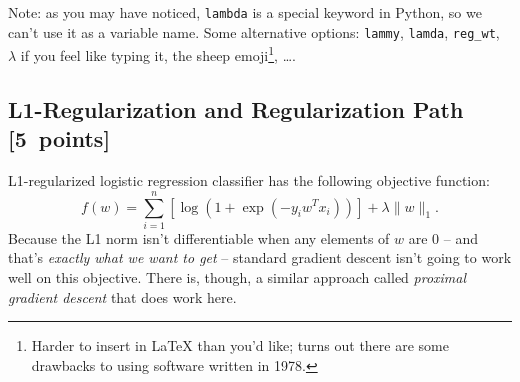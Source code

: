 \documentclass{article}
\newcommand\pts[1]{\textcolor{pointscolour}{[#1~points]}}
\newcommand{\norm}[1]{\lVert #1 \rVert}
\begin{document}
Note: as you may have noticed, \verb|lambda| is a special keyword in Python, so we can't use it as a variable name.
Some alternative options:
\verb|lammy|,
\verb|lamda|,
\verb|reg_wt|,
$\lambda$ if you feel like typing it,
the sheep emoji\footnote{Harder to insert in \LaTeX{} than you'd like; turns out there are some drawbacks to using software written in 1978.},
\dots.


\subsection{L1-Regularization and Regularization Path \pts{5}}
L1-regularized logistic regression classifier has the following objective function:
\[
f(w) = \sum_{i=1}^n \left[\log(1+\exp(-y_iw^Tx_i))\right] + \lambda\norm{w}_1.
\]
Because the L1 norm isn't differentiable when any elements of $w$ are $0$ -- and that's \emph{exactly what we want to get} -- standard gradient descent isn't going to work well on this objective.
There is, though, a similar approach called \emph{proximal gradient descent} that does work here.%
\end{document}
